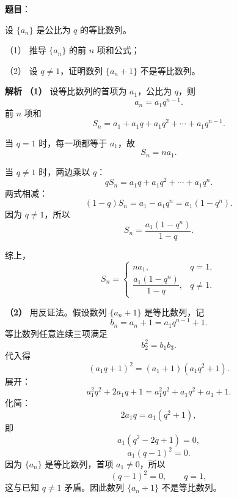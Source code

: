 \begin{answer}

\textbf{题目}：

设 $\{a_n\}$ 是公比为 $q$ 的等比数列。

（1） 推导 $\{a_n\}$ 的前 $n$ 项和公式；

（2） 设 $q\neq1$，证明数列 $\{a_n+1\}$ 不是等比数列。

\textbf{解析}
\textbf{（1）} 设等比数列的首项为 $a_1$，公比为 $q$，则
\nopagebreak[4]
\[a_n=a_1q^{n-1}.\]
前 $n$ 项和
\nopagebreak[4]
\[S_n=a_1+a_1q+a_1q^2+\cdots+a_1q^{n-1}.\]

当 $q=1$ 时，每一项都等于 $a_1$，故
\nopagebreak[4]
\[S_n=na_1.\]

当 $q\neq1$ 时，两边乘以 $q$：
\nopagebreak[4]
\[qS_n=a_1q+a_1q^2+\cdots+a_1q^n.\]
两式相减：
\nopagebreak[4]
\[(1-q)S_n=a_1-a_1q^n=a_1(1-q^n).\]
因为 $q\neq1$，所以
\nopagebreak[4]
\[S_n=\frac{a_1(1-q^n)}{1-q}.\]

综上，
\nopagebreak[4]
\[S_n=
\begin{cases}
na_1,&q=1,\\[6pt]
\dfrac{a_1(1-q^n)}{1-q},&q\neq1.
\end{cases}\]

\textbf{（2）} 用反证法。假设数列 $\{a_n+1\}$ 是等比数列，记
\nopagebreak[4]
\[b_n=a_n+1=a_1q^{n-1}+1.\]
等比数列任意连续三项满足
\nopagebreak[4]
\[b_2^2=b_1b_3.\]
代入得
\nopagebreak[4]
\[(a_1q+1)^2=(a_1+1)(a_1q^2+1).\]
展开：
\nopagebreak[4]
\[a_1^2q^2+2a_1q+1=a_1^2q^2+a_1q^2+a_1+1.\]
化简：
\nopagebreak[4]
\[2a_1q=a_1(q^2+1),\]
即
\nopagebreak[4]
\[a_1(q^2-2q+1)=0,\]
\nopagebreak[4]
\[a_1(q-1)^2=0.\]
因为 $\{a_n\}$ 是等比数列，首项 $a_1\neq0$，所以
\nopagebreak[4]
\[(q-1)^2=0,\qquad q=1,\]
这与已知 $q\neq1$ 矛盾。因此数列 $\{a_n+1\}$ 不是等比数列。



\end{answer}
